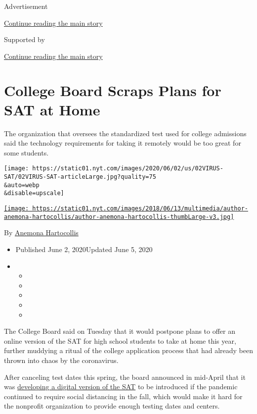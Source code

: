 Advertisement

\protect\hyperlink{after-top}{Continue reading the main story}

Supported by

\protect\hyperlink{after-sponsor}{Continue reading the main story}

\hypertarget{college-board-scraps-plans-for-sat-at-home}{%
\section{College Board Scraps Plans for SAT at
Home}\label{college-board-scraps-plans-for-sat-at-home}}

The organization that oversees the standardized test used for college
admissions said the technology requirements for taking it remotely would
be too great for some students.

\texttt{[image: https://static01.nyt.com/images/2020/06/02/us/02VIRUS-SAT/02VIRUS-SAT-articleLarge.jpg?quality=75\\\&auto=webp\\\&disable=upscale]}

\href{https://www.nytimes.com/by/anemona-hartocollis}{\texttt{[image: https://static01.nyt.com/images/2018/06/13/multimedia/author-anemona-hartocollis/author-anemona-hartocollis-thumbLarge-v3.jpg]}}

By \href{https://www.nytimes.com/by/anemona-hartocollis}{Anemona
Hartocollis}

\begin{itemize}
\item
  Published June 2, 2020Updated June 5, 2020
\item
  \begin{itemize}
  \item
  \item
  \item
  \item
  \item
  \end{itemize}
\end{itemize}

The College Board said on Tuesday that it would postpone plans to offer
an online version of the SAT for high school students to take at home
this year, further muddying a ritual of the college application process
that had already been thrown into chaos by the coronavirus.

After canceling test dates this spring, the board announced in mid-April
that it was
\href{https://www.nytimes.com/2020/04/15/us/sat-act-test-coronavirus.html}{developing
a digital version of the SAT} to be introduced if the pandemic continued
to require social distancing in the fall, which would make it hard for
the nonprofit organization to provide enough testing dates and centers.

